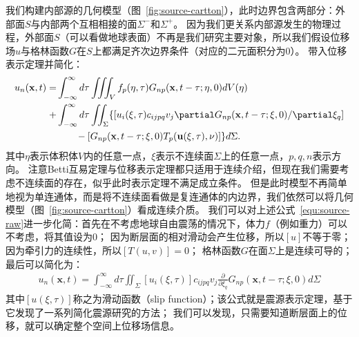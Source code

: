 我们构建内部源的几何模型（图~\ref{fig:source-cartton}），此时边界包含两部分：外部面$S$与内部两个互相相接的面$\Sigma^-$和$\Sigma^+$。
因为我们更关系内部源发生的物理过程，外部面$S$（可以看做地球表面）不再是我们研究主要对象，所以我们假设位移场$u$与格林函数$G$在$S$上都满足齐次边界条件（对应的二元面积分为0）。
带入位移表示定理并简化：
\begin{align}
    u_{n}(\mathbf{x}, t)=& \int\nolimits_{-\infty}^{\infty} d \tau \iiint\nolimits_{V} f_{p}(\eta, \tau) G_{n p}(\mathbf{x}, t-\tau ; \eta, 0) d V(\eta) \notag \\
    +  & \int\nolimits_{-\infty}^{\infty} d \tau \iint\nolimits_{\Sigma} \{ [u_{i}(\xi, \tau) c_{i j p q} v_{j} \partial G_{n p}(\mathbf{x}, t-\tau ; \xi, 0) / \partial \xi_{q}] \notag \\
    & \qquad - [G_{n p}(\mathbf{x}, t-\tau ; \xi, 0) T_{p}(\mathbf{u}(\xi, \tau), \nu) ] \} d \Sigma .
    \label{equ:source-raw}
\end{align}
其中$\eta$表示体积体$V$内的任意一点，$\xi$表示不连续面$\Sigma$上的任意一点，$p,q,n$表示方向。
注意Betti互易定理与位移表示定理都只适用于连续介绍，但现在我们需要考虑不连续面的存在，似乎此时表示定理不满足成立条件。
但是此时模型不再简单地视为单连通体，而是将不连续面看做是复连通体的内边界，我们依然可以将几何模型（图~\ref{fig:source-cartton}）看成连续介质\citep{Nabarro1951}。
我们可以对上述公式~\ref{equ:source-raw}进一步化简：首先在不考虑地球自由震荡的情况下，体力$f$（例如重力）可以不考虑，将其值设为0；
因为断层面的相对滑动会产生位移，所以$[u]$不等于零；
因为牵引力的连续性，所以$[T(u,v)]=0$；
格林函数$G$在面$\Sigma$上是连续可导的；最后可以简化为：
\begin{align}
    u_{n}(\mathbf{x}, t)= \int\nolimits_{-\infty}^{\infty} d \tau \iint\nolimits_{\Sigma}  [u_{i}(\xi, \tau)] c_{i j p q} v_{j} \frac{\partial}{\partial {\xi_q}} G_{n p}(\mathbf{x}, t-\tau ; \xi, 0)  d \Sigma 
   \label{equ:source-rep}
\end{align}
其中$[u(\xi,\tau)]$称之为滑动函数（slip function）；该公式就是震源表示定理，基于它发现了一系列简化震源研究的方法；
我们可以发现，只需要知道断层面上的位移，就可以确定整个空间上位移场信息。


